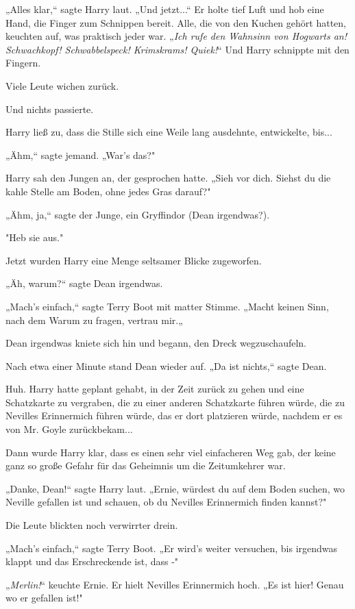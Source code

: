 {„Alles klar,“ sagte Harry laut. „Und jetzt...“ Er holte tief Luft und hob eine Hand, die Finger zum Schnippen bereit. Alle, die von den Kuchen gehört hatten, keuchten auf, was praktisch jeder war. „\emph{Ich rufe den Wahnsinn von Hogwarts an!} \emph{\emph{Schwachkopf! Schwabbelspeck! Krimskrams! Quiek}!}“ Und Harry schnippte mit den Fingern.

Viele Leute wichen zurück.

Und nichts passierte.

Harry ließ zu, dass die Stille sich eine Weile lang ausdehnte, entwickelte, bis...

„Ähm,“ sagte jemand. „War's das?"

Harry sah den Jungen an, der gesprochen hatte. „Sieh vor dich. Siehst du die kahle Stelle am Boden, ohne jedes Gras darauf?"

„Ähm, ja,“ sagte der Junge, ein Gryffindor (Dean irgendwas?).

"Heb sie aus."

Jetzt wurden Harry eine Menge seltsamer Blicke zugeworfen.

„Äh, warum?“ sagte Dean irgendwas.

„Mach's einfach,“ sagte Terry Boot mit matter Stimme. „Macht keinen Sinn, nach dem Warum zu fragen, vertrau mir.„

Dean irgendwas kniete sich hin und begann, den Dreck wegzuschaufeln.

Nach etwa einer Minute stand Dean wieder auf. „Da ist nichts,“ sagte Dean.

Huh. Harry hatte geplant gehabt, in der Zeit zurück zu gehen und eine Schatzkarte zu vergraben, die zu einer anderen Schatzkarte führen würde, die zu Nevilles Erinnermich führen würde, das er dort platzieren würde, nachdem er es von Mr. Goyle zurückbekam...

Dann wurde Harry klar, dass es einen sehr viel einfacheren Weg gab, der keine ganz so große Gefahr für das Geheimnis um die Zeitumkehrer war.

„Danke, Dean!“ sagte Harry laut. „Ernie, würdest du auf dem Boden suchen, wo Neville gefallen ist und schauen, ob du Nevilles Erinnermich finden kannst?"

Die Leute blickten noch verwirrter drein.

„Mach's einfach,“ sagte Terry Boot. „Er wird's weiter versuchen, bis irgendwas klappt und das Erschreckende ist, dass -"

„\emph{Merlin!}“ keuchte Ernie. Er hielt Nevilles Erinnermich hoch. „Es ist hier! Genau wo er gefallen ist!"

}
